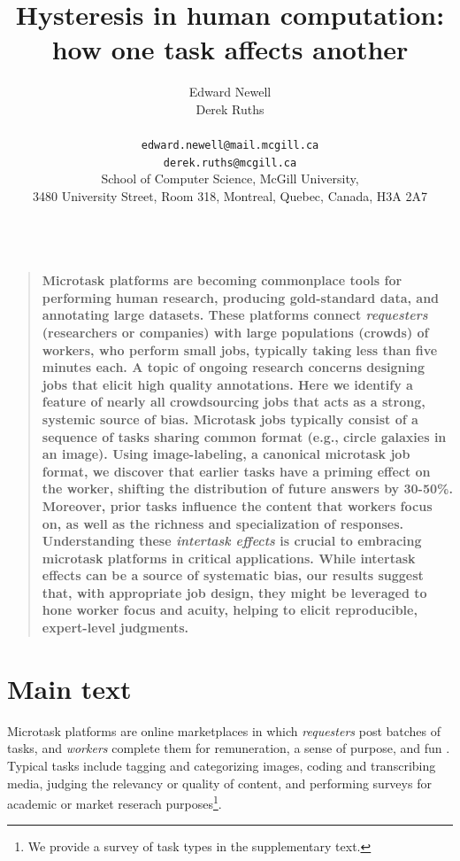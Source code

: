 \documentclass[12pt]{article}
\title{Hysteresis in human computation:\\ how one task affects another}
\author
{Edward Newell \\ Derek Ruths\\
\\
\normalsize{\texttt{edward.newell@mail.mcgill.ca}}\\
\normalsize{\texttt{derek.ruths@mcgill.ca}}\\
\normalsize{School of Computer Science, McGill University,}\\
\normalsize{3480 University Street, Room 318, Montreal, Quebec, Canada, H3A 2A7}\\
\\
}
\date{}
\newenvironment{sciabstract}{%
\begin{quote} \bf}
{\end{quote}}
\begin{document}
 


\baselineskip24pt


\maketitle 




\begin{sciabstract}
Microtask platforms are becoming commonplace tools for performing human
research, producing gold-standard data, and annotating large datasets.
These platforms connect \textit{requesters}
(researchers or companies) with large populations (crowds) of workers, who 
perform small jobs, typically taking less than five minutes each.
A topic of ongoing research concerns designing jobs that elicit high 
quality annotations. Here we identify a feature of nearly all crowdsourcing 
jobs that acts as a strong, systemic source of bias. 
Microtask jobs typically consist of a sequence 
of tasks sharing common format 
(e.g., circle galaxies in an image). 
Using image-labeling, a canonical microtask job format, we 
discover that earlier tasks have a priming effect on the worker, shifting the 
distribution of future answers by 30-50\%. 
Moreover, prior tasks influence the content that workers focus on, 
as well as the richness and specialization of responses. 
Understanding these \textit{intertask effects} is crucial 
to embracing microtask platforms in critical applications.
While intertask effects can be a source of systematic bias, 
our results suggest that, with appropriate job design, 
they might be leveraged to hone worker focus and acuity, 
helping to elicit reproducible, expert-level judgments.
\end{sciabstract}

\section*{Main text}
Microtask platforms are online marketplaces in which \textit{requesters} 
post batches of tasks, and \textit{workers} complete them
for remuneration, a sense of purpose, and fun
\cite{kazai2013analysis}.
Typical tasks include tagging and categorizing images,
coding and transcribing media,
judging the relevancy or quality of content, 
and performing surveys for academic or market reserach purposes\footnote{We provide a survey of task types in the supplementary text.}.
\end{document}

